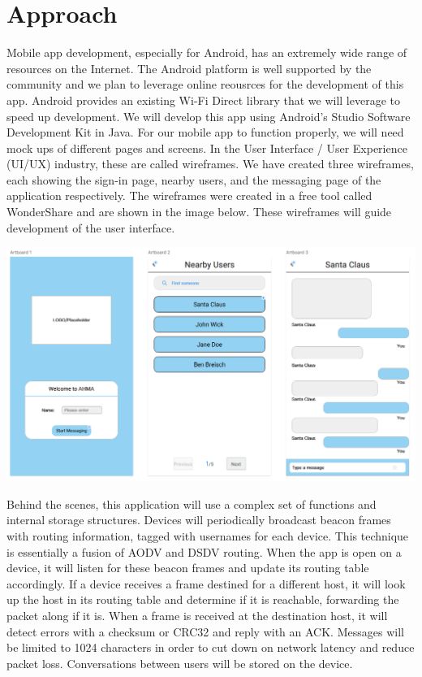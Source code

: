 \documentclass[10pt]{article}
\begin{document}
\section{Approach} %
Mobile app development, especially for Android, has an extremely wide range of resources on the Internet. The Android platform is well supported by the community and we plan to leverage online reousrces for the development of this app. Android provides an existing Wi-Fi Direct library that we will leverage to speed up development. We will develop this app using Android's Studio Software Development Kit in Java. For our mobile app to function properly, we will need mock ups of different pages and screens. In the User Interface / User Experience (UI/UX) industry, these are called wireframes. We have created three wireframes, each showing the sign-in page, nearby users, and the messaging page of the application respectively. The wireframes were created in a free tool called WonderShare and are shown in the image below. These wireframes will guide development of the user interface.\\
\begin{center}
    \includegraphics[scale=0.5]{wireframe.png} \\
\end{center}
Behind the scenes, this application will use a complex set of functions and internal storage structures. Devices will periodically broadcast beacon frames with routing information, tagged with usernames for each device. This technique is essentially a fusion of AODV and DSDV routing. When the app is open on a device, it will listen for these beacon frames and update its routing table accordingly. If a device receives a frame destined for a different host, it will look up the host in its routing table and determine if it is reachable, forwarding the packet along if it is. When a frame is received at the destination host, it will detect errors with a checksum or CRC32 and reply with an ACK. Messages will be limited to 1024 characters in order to cut down on network latency and reduce packet loss. Conversations between users will be stored on the device.
\end{document}
